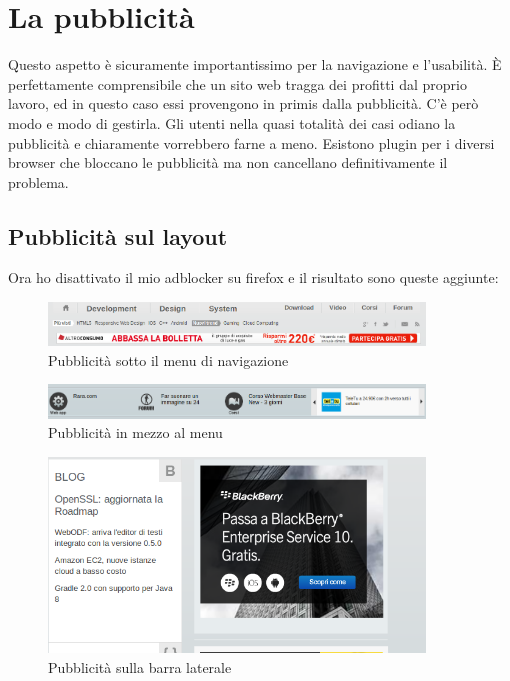 \section{La pubblicità}

Questo aspetto è sicuramente importantissimo per la navigazione e l'usabilità. È perfettamente comprensibile che un sito web tragga dei profitti dal proprio lavoro, ed in questo caso essi provengono in primis dalla pubblicità. C'è però modo e modo di gestirla. Gli utenti nella quasi totalità dei casi odiano la pubblicità e chiaramente vorrebbero farne a meno. Esistono plugin per i diversi browser che bloccano le pubblicità ma non cancellano definitivamente il problema.

\subsection{Pubblicità sul layout}

Ora ho disattivato il mio adblocker su firefox e il risultato sono queste aggiunte:

\begin{figure}[H]
\centering
\includegraphics[width=100mm]{images/adv1.png}
\caption{Pubblicità sotto il menu di navigazione}
\end{figure}

\begin{figure}[H]
\centering
\includegraphics[width=100mm]{images/adv2.png}
\caption{Pubblicità in mezzo al menu}
\end{figure}

\begin{figure}[H]
\centering
\includegraphics[width=100mm]{images/adv3.png}
\caption{Pubblicità sulla barra laterale}
\end{figure}

